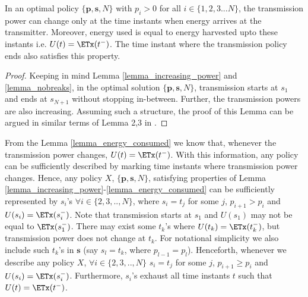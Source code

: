 \begin{lemma}
In an optimal policy $\{\bm{p},\bm{s},N\}$ with $p_i>0$ for all $i\in\{1,2,3...N\}$, the transmission power can change only at the time instants when energy arrives at the transmitter. Moreover, energy used is equal to energy harvested upto these instants i.e. $U(t) = \ETx(t^-)$. The time instant where the transmission policy ends also satisfies this property.
\label{lemma_energy_consumed} 
\end{lemma}
\begin{proof}
Keeping in mind Lemma \ref{lemma_increasing_power} and \ref{lemma_nobreaks}, in the optimal solution $\{\bm{p}, \bm{s}, N\}$, transmission starts at $s_1$ and ends at $s_{N+1}$ without stopping in-between. Further, the transmission powers are also increasing. Assuming such a structure, the proof of this Lemma can be argued in similar terms of Lemma 2,3 in \cite{Yang}. 
\end{proof}	

From the Lemma \ref{lemma_energy_consumed} we know that, whenever the transmission power changes, $ U(t) = \ETx(t^-)$. With this information, any policy can be sufficiently described by marking time instants where transmission power changes. Hence, any policy $X$, $\{\bm{p},\bm{s},N\}$, satisfying properties of Lemma \ref{lemma_increasing_power}-\ref{lemma_energy_consumed} can be sufficiently represented by $s_i$'s $\forall i\in\{2,3,..,N\}$, where $s_i=t_j$ for some $j$, $p_{i+1}>p_i$ and $U(s_i)=\ETx(s_i^-)$. Note that transmission starts at $s_1$ and $U(s_1)$ may not be equal to $\ETx(s_1^-)$. There may exist some $t_k$'s where $U(t_k)=\ETx(t_k^-)$, but transmission power does not change at $t_k$. For notational simplicity we also include such $t_k$'s in $\bm{s}$ (say $s_l=t_k$, where $p_{l-1}=p_l$). Henceforth, whenever we describe any policy $X$, $\forall i\in\{2,3,..,N\}$ $s_i=t_j$ for some $j$, $p_{i+1}\ge p_i$ and $U(s_i)=\ETx(s_i^-)$. Furthermore, $s_i$'s exhaust all time instants $t$ such that $U(t)= \ETx(t^-)$.
  
